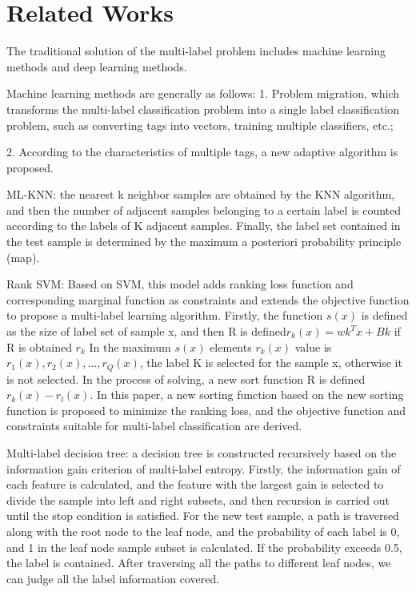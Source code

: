 \documentclass[10pt,twocolumn,letterpaper]{article}
\begin{document}
\section{Related Works}\label{sec:RelatedWorks}
The traditional solution of the multi-label problem includes machine learning methods and deep learning methods.\par
Machine learning methods are generally as follows: 
1. Problem migration, which transforms the multi-label classification problem into a single label classification problem, such as converting tags into vectors, training multiple classifiers, etc.; \par
2. According to the characteristics of multiple tags, a new adaptive algorithm is proposed.\par
ML-KNN\cite{zhang2007ml}: the nearest k neighbor samples are obtained by the KNN algorithm, and then the number of adjacent samples belonging to a certain label is counted according to the labels of K adjacent samples. Finally, the label set contained in the test sample is determined by the maximum a posteriori probability principle (map).\par
Rank SVM\cite{li2004multilabel}: Based on SVM, this model adds ranking loss function and corresponding marginal function as constraints and extends the objective function to propose a multi-label learning algorithm. Firstly, the function $s \left(x \right)$ is defined as the size of label set of sample x, and then R is defined$r_k \left(x \right) = wk^Tx + Bk $ if R is obtained $r_k$ In the maximum $s(x)$ elements $r_k(x)$ value is ${r_1\left(x\right), r_2\left(x\right),\ldots,r_Q(x) }$, the label K is selected for the sample x, otherwise it is not selected. In the process of solving, a new sort function R is defined$r_k\left(x\right)-r_ l(x)$. In this paper, a new sorting function based on the new sorting function is proposed to minimize the ranking loss, and the objective function and constraints suitable for multi-label classification are derived.\par
Multi-label decision tree\cite{vens2008decision}: a decision tree is constructed recursively based on the information gain criterion of multi-label entropy. Firstly, the information gain of each feature is calculated, and the feature with the largest gain is selected to divide the sample into left and right subsets, and then recursion is carried out until the stop condition is satisfied. For the new test sample, a path is traversed along with the root node to the leaf node, and the probability of each label is 0, and 1 in the leaf node sample subset is calculated. If the probability exceeds 0.5, the label is contained. After traversing all the paths to different leaf nodes, we can judge all the label information covered.\par
\end{document}
